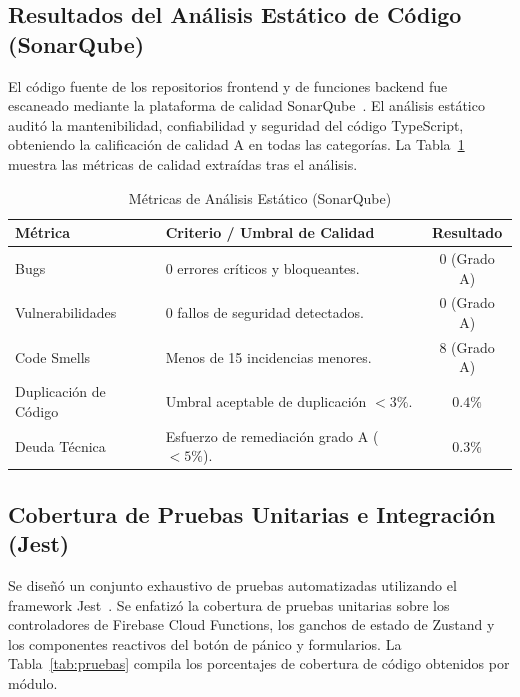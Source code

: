 \documentclass[conference]{IEEEtran}
\begin{document}
\subsection{Resultados del Análisis Estático de Código (SonarQube)}
El código fuente de los repositorios frontend y de funciones backend fue escaneado mediante la plataforma de calidad SonarQube~\cite{sonar}. El análisis estático auditó la mantenibilidad, confiabilidad y seguridad del código TypeScript, obteniendo la calificación de calidad A en todas las categorías. La Tabla~\ref{tab:sonarqube} muestra las métricas de calidad extraídas tras el análisis.

\begin{table}[htbp]
\caption{Métricas de Análisis Estático (SonarQube)}
\label{tab:sonarqube}
\begin{center}
\begin{tabular}{lp{2.8cm}c}
\toprule
\textbf{Métrica} & \textbf{Criterio / Umbral de Calidad} & \textbf{Resultado} \\ \midrule
Bugs & 0 errores críticos y bloqueantes. & 0 (Grado A) \\ \addlinespace
Vulnerabilidades & 0 fallos de seguridad detectados. & 0 (Grado A) \\ \addlinespace
Code Smells & Menos de 15 incidencias menores. & 8 (Grado A) \\ \addlinespace
Duplicación de Código & Umbral aceptable de duplicación $< 3\%$. & $0.4\%$ \\ \addlinespace
Deuda Técnica & Esfuerzo de remediación grado A ($<5\%$). & $0.3\%$ \\
\bottomrule
\end{tabular}
\end{center}
\end{table}

\subsection{Cobertura de Pruebas Unitarias e Integración (Jest)}
Se diseñó un conjunto exhaustivo de pruebas automatizadas utilizando el framework Jest~\cite{jest}. Se enfatizó la cobertura de pruebas unitarias sobre los controladores de Firebase Cloud Functions, los ganchos de estado de Zustand y los componentes reactivos del botón de pánico y formularios. La Tabla~\ref{tab:pruebas} compila los porcentajes de cobertura de código obtenidos por módulo.
\end{document}
